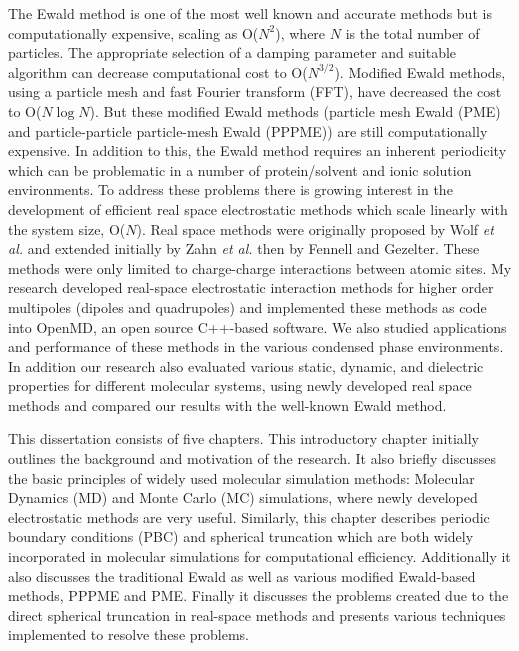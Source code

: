 The Ewald method is one of the most well known and accurate methods but is computationally expensive, scaling as O($N^2$), where $N$ is the total number of particles. The appropriate selection of a damping parameter and suitable algorithm can decrease computational cost to O($N^{3/2}$).\cite{Perram88} Modified Ewald methods, using a particle mesh and fast Fourier transform (FFT), have decreased the cost to O($N\log N$). \cite{Shimada93, Luty95, Darden93,Essmann95} But these modified Ewald methods (particle mesh Ewald (PME) and particle-particle particle-mesh Ewald (PPPME)) are still computationally expensive. In addition to this, the Ewald method requires an inherent periodicity which can be problematic in a number of protein/solvent and ionic solution environments. \cite{Roberts94,Roberts95,Luty96,Hunenberger99a,Hunenberger99b,Weber00,Gezelter06} To address these problems there is growing interest in the development of efficient real space electrostatic methods which scale linearly with the system size, O($N$). Real space methods were originally proposed by Wolf \textit{et al.} \cite{Wolf99} and extended initially by Zahn \textit{et al.}\cite{Zahn02} then by Fennell and Gezelter. \cite{Gezelter06} These methods were only limited to charge-charge interactions between atomic sites. My research developed real-space electrostatic interaction methods for higher order multipoles (dipoles and quadrupoles) and implemented these methods as code into OpenMD, \cite{Openmd2.3} an open source C++-based software. We also studied applications and performance of these methods in the various condensed phase environments. In addition our research also evaluated various static, dynamic, and dielectric properties for different molecular systems, using newly developed real space methods and compared our results with the well-known Ewald method. 

%

This dissertation consists of five chapters. This introductory chapter initially outlines the background and motivation of the research. It also briefly  discusses the basic principles of widely used molecular simulation methods: Molecular Dynamics (MD) and Monte Carlo (MC) simulations, where newly developed electrostatic methods are very useful. Similarly, this chapter describes periodic boundary conditions (PBC) and spherical truncation which are both widely incorporated in molecular simulations for computational efficiency. Additionally it also discusses the traditional Ewald as well as various modified Ewald-based methods, PPPME and PME. Finally it discusses the problems created due to the direct spherical truncation in real-space methods and presents various techniques implemented to resolve these problems.

